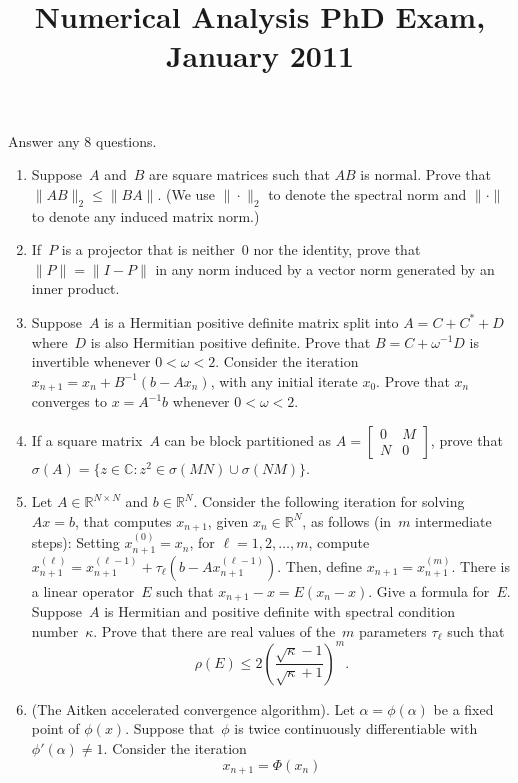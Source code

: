 \documentclass[11pt,letterpaper]{article}
\title{Numerical Analysis PhD Exam, January 2011}
\author{}
\date{}
\newenvironment{examproblems}[2]{%
  \def\ProblemHeadingTag{#2}%
  \AssignTaggingSocketPlug{block/list/label}{examproblem}%
  \begin{enumerate}%
  \setcounter{enumi}{#1}%
  \renewcommand{\labelenumi}{\textbf{\theenumi.}}%
  \setlength{\topsep}{0.35em}%
  \setlength{\partopsep}{0pt}%
  \setlength{\itemsep}{0.48em}%
  \setlength{\parsep}{0.18em}%
}{\end{enumerate}}
\newenvironment{examinstructions}{%
  \par\begingroup\itshape
}{%
  \par\endgroup\vspace{0.18em}
}
\begin{document}
\maketitle
\thispagestyle{empty}
\begin{examinstructions}
Answer any 8 questions.
\end{examinstructions}
\begin{examproblems}{0}{H2}
\def\ProblemHeadingText{Problem 1.}
\item
Suppose~\(A\) and~\(B\) are square matrices such that \(AB\) is normal. Prove that \(\|AB\|_2 \leq \|BA\|\). (We use \(\|\cdot\|_2\) to denote the spectral norm and \(\|\cdot\|\) to denote any induced matrix norm.)
\def\ProblemHeadingText{Problem 2.}
\item
If~\(P\) is a projector that is neither~\(0\) nor the identity, prove that \(\|P\|=\|I-P\|\) in any norm induced by a vector norm generated by an inner product.
\def\ProblemHeadingText{Problem 3.}
\item
Suppose~\(A\) is a Hermitian positive definite matrix split into \(A=C+C^*+D\) where~\(D\) is also Hermitian positive definite. Prove that \(B=C+\omega^{-1}D\) is invertible whenever \(0<\omega<2\). Consider the iteration \(x_{n+1}=x_n+B^{-1}(b-Ax_n)\), with any initial iterate \(x_0\). Prove that \(x_n\) converges to \(x=A^{-1}b\) whenever \(0<\omega<2\).
\def\ProblemHeadingText{Problem 4.}
\item
If a square matrix~\(A\) can be block partitioned as \(A=\begin{bmatrix}0&M\\N&0\end{bmatrix}\), prove that \(\sigma(A)=\{z\in\mathbb{C}:z^2\in\sigma(MN)\cup\sigma(NM)\}\).
\def\ProblemHeadingText{Problem 5.}
\item
Let \(A\in\mathbb{R}^{N\times N}\) and \(b\in\mathbb{R}^N\). Consider the following iteration for solving \(Ax=b\), that computes \(x_{n+1}\), given \(x_n\in\mathbb{R}^N\), as follows (in~\(m\) intermediate steps): Setting \(x_{n+1}^{(0)}=x_n\), for \(\ell=1,2,\ldots,m\), compute \(x_{n+1}^{(\ell)}=x_{n+1}^{(\ell-1)}+\tau_\ell(b-Ax_{n+1}^{(\ell-1)})\). Then, define \(x_{n+1}=x_{n+1}^{(m)}\). There is a linear operator~\(E\) such that \(x_{n+1}-x=E(x_n-x)\). Give a formula for~\(E\). Suppose~\(A\) is Hermitian and positive definite with spectral condition number~\(\kappa\). Prove that there are real values of the~\(m\) parameters \(\tau_\ell\) such that
\[
\rho(E)\leq 2\left(\frac{\sqrt{\kappa}-1}{\sqrt{\kappa}+1}\right)^m.
\]
\def\ProblemHeadingText{Problem 6.}
\item
(The Aitken accelerated convergence algorithm). Let \(\alpha=\phi(\alpha)\) be a fixed point of \(\phi(x)\). Suppose that~\(\phi\) is twice continuously differentiable with \(\phi'(\alpha)\neq1\). Consider the iteration
\[
x_{n+1}=\Phi(x_n)
\]


\end{examproblems}
\end{document}
